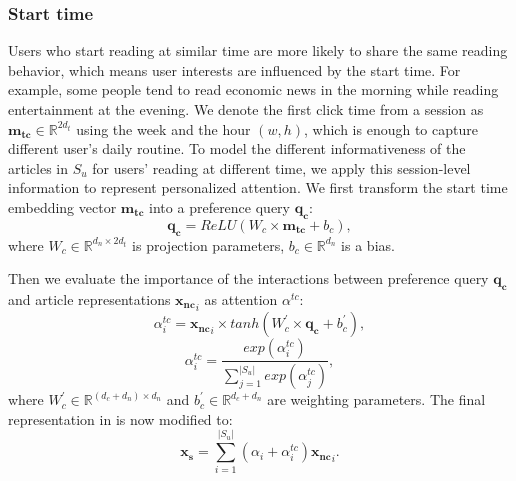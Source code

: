 \subsubsection{Start time}
Users who start reading at similar time are more likely to share the same reading behavior, which means user interests are influenced by the start time. For example, some people tend to read economic news in the morning while reading entertainment at the evening. We denote the first click time from a session as $\mathbf{m_{tc}}\in \mathbb{R}^{2d_t}$ using the week and the hour $(w, h)$, which is enough to capture different user's daily routine. To model the different informativeness of the articles in $S_u$ for users' reading at different time, we apply this session-level information to represent personalized attention. We first transform the start time embedding vector $\mathbf{m_{tc}}$ into a preference query $\mathbf{q_c}$:
\begin{equation}
    \mathbf{q_c} = ReLU(W_c \times \mathbf{m_{tc}} + b_c),
\end{equation}
where $W_c \in \mathbb{R}^{d_n \times 2d_t}$ is projection parameters, $b_c \in \mathbb{R}^{d_n}$ is a bias.

Then we evaluate the importance of the interactions between preference query $\mathbf{q_c}$ and article representations $\mathbf{x_{nc}}_i$ as attention $\alpha^{tc}$:
\begin{equation}
    \alpha_i^{tc} = \mathbf{x_{nc}}_i \times tanh ( W_c^{\prime} \times \mathbf{q_c} + b_c^{\prime}),
\end{equation}
\begin{equation}
    \alpha_i^{tc} = \frac{exp(\alpha_i^{tc})}{\sum_{j=1}^{|S_u|}exp(\alpha_j^{tc})},
\end{equation}
where $W_c^{\prime} \in \mathbb{R}^{(d_c+d_n)\times d_n}$ and $b_c^{\prime} \in \mathbb{R}^{d_c+d_n}$ are weighting parameters. The final representation in  is now modified to:
\begin{equation}
    \mathbf{x_s} = \sum_{i=1}^{|S_u|} (\alpha_i+\alpha_i^{tc}) \mathbf{x_{nc}}_i.
\end{equation}

